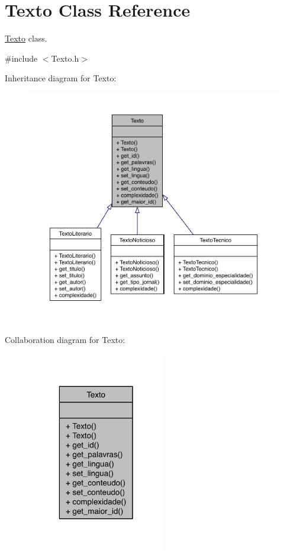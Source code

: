 \hypertarget{class_texto}{\section{Texto Class Reference}
\label{class_texto}
}


\hyperlink{class_texto}{Texto} class.  




{\ttfamily \#include $<$Texto.\-h$>$}



Inheritance diagram for Texto\-:
\nopagebreak
\begin{figure}[H]
\begin{center}
\leavevmode
\includegraphics[width=350pt]{class_texto__inherit__graph}
\end{center}
\end{figure}


Collaboration diagram for Texto\-:
\nopagebreak
\begin{figure}[H]
\begin{center}
\leavevmode
\includegraphics[width=172pt]{class_texto__coll__graph}
\end{center}
\end{figure}
